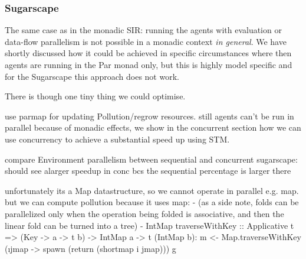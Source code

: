 \subsubsection{Sugarscape}
The same case as in the monadic SIR: running the agents with evaluation or data-flow parallelism is not possible in a monadic context  \textit{in general}. We have shortly discussed how it could be achieved in specific circumstances where then agents are running in the Par monad only, but this is highly model specific and for the Sugarscape this approach does not work. 

There is though one tiny thing we could optimise.

use parmap for updating Pollution/regrow resources. still agents can't be run in parallel because of monadic effects, we show in the concurrent section how we can use concurrency to achieve a substantial speed up using STM.

compare Environment parallelism between sequential and concurrent sugarscape: should see alarger speedup in conc bcs the sequential percentage is larger there

unfortunately its a Map datastructure, so we cannot operate in parallel e.g. map. but we can compute pollution because it uses map:
- (as a side note, folds can be parallelized only when the operation being folded is associative, and then the linear fold can be turned into a tree)
- IntMap traverseWithKey :: Applicative t => (Key -> a -> t b) -> IntMap a -> t (IntMap b):
	m <- Map.traverseWithKey (\i jmap -> spawn (return (shortmap i jmap))) g
	